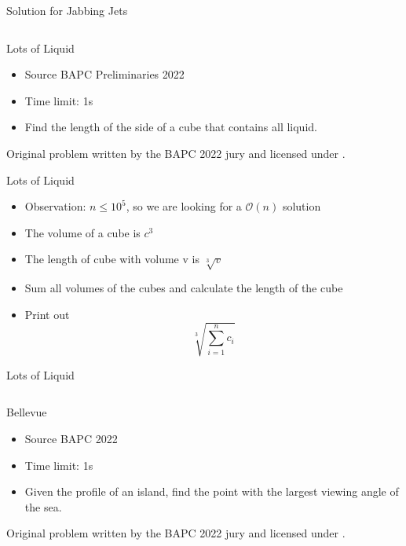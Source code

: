 \documentclass[11pt,pdf, aspectratio=169]{beamer}
\begin{document}
  \begin{frame}[containsverbatim]{Solution for Jabbing Jets}
    \inputminted{python}{code/session-1/python/dapc-j.py}
  \end{frame}
  \begin{frame}{Lots of Liquid}
    \begin{itemize}
      \item Source BAPC Preliminaries 2022
      \item Time limit: 1s
      \item Find the length of the side of a cube that contains all liquid.
    \end{itemize}
    Original problem written by the BAPC 2022 jury and licensed under \doclicenseLongNameRef.

    \doclicenseImage
  \end{frame}
  \begin{frame}{Lots of Liquid}
    \begin{itemize}
      \item<1-> Observation: $n \leq 10^5$, so we are looking for a $\mathcal{O}(n)$ solution
      \item<2-> The volume of a cube is $c^3$
      \item<3-> The length of cube with volume v is $\sqrt[3]{v}$
      \item<4-> Sum all volumes of the cubes and calculate the length of the cube
      \item<4-> Print out \[\sqrt[3]{\sum_{i=1}^nc_i}\]
    \end{itemize}
  \end{frame}
  \begin{frame}[containsverbatim]{Lots of Liquid}
    \inputminted{python}{code/session-1/python/dapc-l.py}
  \end{frame}
  \begin{frame}{Bellevue}
    \begin{itemize}
      \item Source BAPC 2022
      \item Time limit: 1s
      \item  Given the profile of an island, find the point with the largest viewing angle of the sea.
    \end{itemize}
    Original problem written by the BAPC 2022 jury and licensed under \doclicenseLongNameRef.

    \doclicenseImage
  \end{frame}
\end{document}
